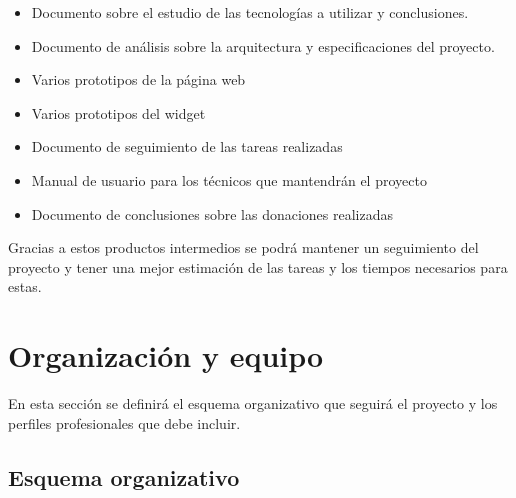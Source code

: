 \begin{itemize}
	\item Documento sobre el estudio de las tecnologías a utilizar y conclusiones.
	\item Documento de análisis sobre la arquitectura y especificaciones del proyecto.
	\item Varios prototipos de la página web
	\item Varios prototipos del widget
	\item Documento de seguimiento de las tareas realizadas
	\item Manual de usuario para los técnicos que mantendrán el proyecto
	\item Documento de conclusiones sobre las donaciones realizadas
\end{itemize}

Gracias a estos productos intermedios se podrá mantener un seguimiento del proyecto y tener una mejor estimación de las tareas y los tiempos necesarios para estas.

\section{Organización y equipo}
En esta sección se definirá el esquema organizativo que seguirá el proyecto y los perfiles profesionales que debe incluir.

\subsection{Esquema organizativo}

